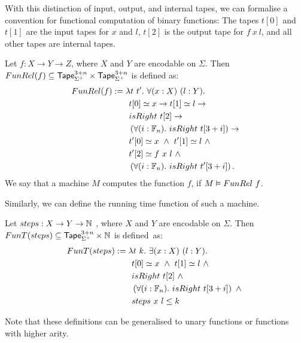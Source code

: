 With this distinction of input, output, and internal tapes, we can formalise a convention for functional computation of binary functions: The tapes
$t[0]$ and $t[1]$ are the input tapes for $x$ and $l$, $t[2]$ is the output tape for $f~x~l$, and all other tapes are internal tapes.
\begin{definition}
  \label{def:Computes2_Rel}
  Let $f : X \to Y \to Z$, where $X$ and $Y$ are encodable on $\Sigma$.  Then
  $FunRel(f) \subseteq \mathsf{Tape}_{\Sigma^+}^{3+n} \times \mathsf{Tape}_{\Sigma^+}^{3+n}$ is defined as:
  \begin{alignat*}{2}
     FunRel(f) &:= \lambda t~t'.~\forall (x:X)~(l:Y). \\
    &\qquad t[0] \simeq x \rightarrow t[1] \simeq l \rightarrow \\
    &\qquad isRight~t[2] \rightarrow \\
    &\qquad \left(\forall (i:\mathbb{F}_n).~isRight~t[3+i] \right) \rightarrow \\
    &\qquad t'[0] \simeq x ~\land~ t'[1] \simeq l ~\land~ \\
    &\qquad t'[2] \simeq f~x~l ~\land~ \\
    &\qquad \left(\forall (i:\mathbb{F}_n).~isRight~t'[3+i] \right).
  \end{alignat*}
  We say that a machine $M$ computes the function $f$, if $M \mathrel{\vDash} FunRel~f$.
\end{definition}

Similarly, we can define the running time function of such a machine.
\begin{definition}
  \label{def:Computes2_T}
  Let $steps : X \rightarrow Y \rightarrow \mathbb{N}$ , where $X$ and $Y$ are encodable on $\Sigma$.  Then $FunT(steps) \subseteq \mathsf{Tape}_{\Sigma^+}^{3+n} \times \mathbb{N}$ is
  defined~as:
  \begin{alignat*}{2}
     FunT(steps) &:= \lambda t~k.~\exists (x:X)~(l:Y). \\
    &\qquad t[0] \simeq x ~\land~ t[1] \simeq l ~\land~ \\
    &\qquad isRight~t[2] ~\land~ \\
    &\qquad \left(\forall (i:\mathbb{F}_n).~isRight~t[3+i] \right) ~\land~ \\
    &\qquad steps~x~l \leq k
  \end{alignat*}
\end{definition}

Note that these definitions can be generalised to unary functions or functions with higher arity.

